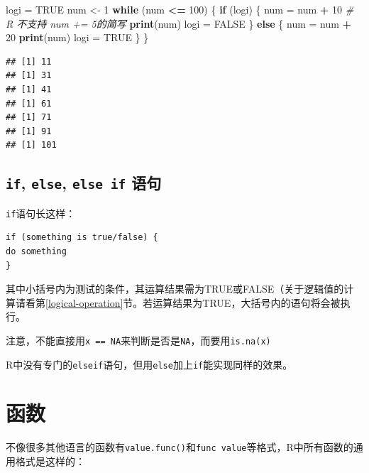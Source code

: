 \documentclass[]{book}
\newenvironment{Shaded}{\begin{snugshade}}{\end{snugshade}}
\newcommand{\CommentTok}[1]{\textcolor[rgb]{0.56,0.35,0.01}{\textit{#1}}}
\newcommand{\ControlFlowTok}[1]{\textcolor[rgb]{0.13,0.29,0.53}{\textbf{#1}}}
\newcommand{\DecValTok}[1]{\textcolor[rgb]{0.00,0.00,0.81}{#1}}
\newcommand{\KeywordTok}[1]{\textcolor[rgb]{0.13,0.29,0.53}{\textbf{#1}}}
\newcommand{\NormalTok}[1]{#1}
\newcommand{\OperatorTok}[1]{\textcolor[rgb]{0.81,0.36,0.00}{\textbf{#1}}}
\newcommand{\OtherTok}[1]{\textcolor[rgb]{0.56,0.35,0.01}{#1}}
\newcommand{\StringTok}[1]{\textcolor[rgb]{0.31,0.60,0.02}{#1}}
\begin{document}
\begin{Shaded}
\begin{Highlighting}[]
\NormalTok{logi =}\StringTok{ }\OtherTok{TRUE}
\NormalTok{num <-}\StringTok{ }\DecValTok{1}
\ControlFlowTok{while}\NormalTok{ (num }\OperatorTok{<=}\StringTok{ }\DecValTok{100}\NormalTok{) \{}
  \ControlFlowTok{if}\NormalTok{ (logi) \{}
\NormalTok{    num =}\StringTok{ }\NormalTok{num }\OperatorTok{+}\StringTok{ }\DecValTok{10} \CommentTok{# R 不支持 num += 5的简写}
    \KeywordTok{print}\NormalTok{(num)}
\NormalTok{    logi =}\StringTok{ }\OtherTok{FALSE}
\NormalTok{  \} }\ControlFlowTok{else}\NormalTok{ \{}
\NormalTok{    num =}\StringTok{ }\NormalTok{num }\OperatorTok{+}\StringTok{ }\DecValTok{20}
    \KeywordTok{print}\NormalTok{(num)}
\NormalTok{    logi =}\StringTok{ }\OtherTok{TRUE}
\NormalTok{  \}}
\NormalTok{\}}
\end{Highlighting}
\end{Shaded}

\begin{verbatim}
## [1] 11
## [1] 31
## [1] 41
## [1] 61
## [1] 71
## [1] 91
## [1] 101
\end{verbatim}

\hypertarget{if-else-else-if-}{%
\subsection{\texorpdfstring{\texttt{if}, \texttt{else}, \texttt{else\ if} 语句}{if, else, else if 语句}}\label{if-else-else-if-}}

\texttt{if}语句长这样：

\begin{verbatim}
if (something is true/false) {
do something
}
\end{verbatim}

其中小括号内为测试的条件，其运算结果需为TRUE或FALSE（关于逻辑值的计算请看第\ref{logical-operation}节。若运算结果为TRUE，大括号内的语句将会被执行。

注意，不能直接用\texttt{x\ ==\ NA}来判断是否是\texttt{NA}，而要用\texttt{is.na(x)}

R中没有专门的\texttt{elseif}语句，但用\texttt{else}加上\texttt{if}能实现同样的效果。

\section{函数}

不像很多其他语言的函数有\texttt{value.func()}和\texttt{func\ value}等格式，R中所有函数的通用格式是这样的：
\end{document}
